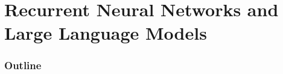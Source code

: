 \renewcommand{\thispart}{6 }
\renewcommand{\thispartname}{Recurrent Neural Networks and Large Language Models}

\part{\thispartname}



\section{Outline}

